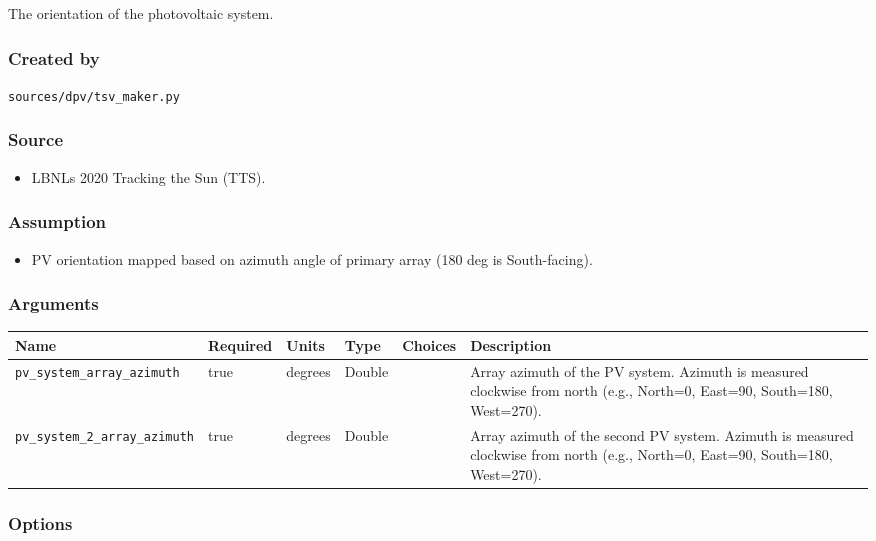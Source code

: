 The orientation of the photovoltaic system.

\subsubsection{Created by}\label{created-by-128}

\texttt{sources/dpv/tsv\_maker.py}

\subsubsection{Source}\label{source-130}

\begin{itemize}
 
\item
  LBNL\textquotesingle s 2020 Tracking the Sun (TTS).
\end{itemize}

\subsubsection{Assumption}\label{assumption-74}

\begin{itemize}
 
\item
  PV orientation mapped based on azimuth angle of primary array (180 deg
  is South-facing).
\end{itemize}

\subsubsection{Arguments}\label{arguments-90}

\begin{longtable}[]{@{}llllll@{}}
\toprule\noalign{}
Name & Required & Units & Type & Choices & Description \\
\midrule\noalign{}
\endhead
\bottomrule\noalign{}
\endlastfoot
\texttt{pv\_system\_array\_azimuth} & true & degrees & Double & & Array
azimuth of the PV system. Azimuth is measured clockwise from north
(e.g., North=0, East=90, South=180, West=270). \\
\texttt{pv\_system\_2\_array\_azimuth} & true & degrees & Double & &
Array azimuth of the second PV system. Azimuth is measured clockwise
from north (e.g., North=0, East=90, South=180, West=270). \\
\end{longtable}

\subsubsection{Options}\label{options-131}

